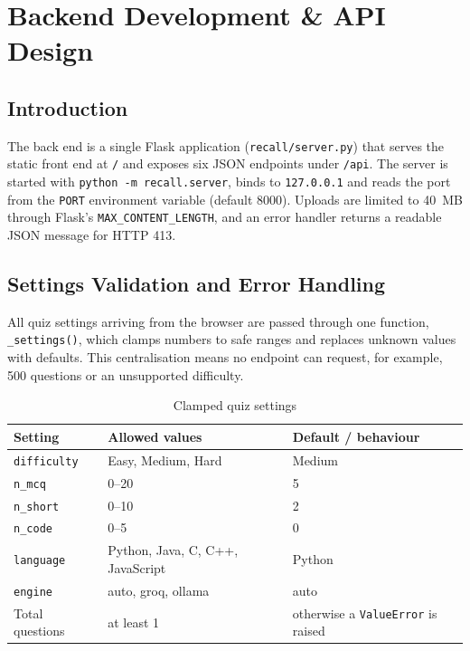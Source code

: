 \chapter{Backend Development \& API Design}

\section{Introduction}
The back end is a single Flask application (\texttt{recall/server.py}) that serves the static front end at \texttt{/} and exposes six JSON endpoints under \texttt{/api}. The server is started with \texttt{python -m recall.server}, binds to \texttt{127.0.0.1} and reads the port from the \texttt{PORT} environment variable (default 8000). Uploads are limited to 40~MB through Flask's \texttt{MAX\_CONTENT\_LENGTH}, and an error handler returns a readable JSON message for HTTP 413.

\section{Settings Validation and Error Handling}
All quiz settings arriving from the browser are passed through one function, \texttt{\_settings()}, which clamps numbers to safe ranges and replaces unknown values with defaults. This centralisation means no endpoint can request, for example, 500 questions or an unsupported difficulty.

\begin{table}[H]
\centering
\begin{tabularx}{\textwidth}{@{} p{3cm} p{3.6cm} X @{}}
\toprule
\textbf{Setting} & \textbf{Allowed values} & \textbf{Default / behaviour} \\
\midrule
\texttt{difficulty} & Easy, Medium, Hard & Medium \\
\texttt{n\_mcq} & 0--20 & 5 \\
\texttt{n\_short} & 0--10 & 2 \\
\texttt{n\_code} & 0--5 & 0 \\
\texttt{language} & Python, Java, C, C++, JavaScript & Python \\
\texttt{engine} & auto, groq, ollama & auto \\
Total questions & at least 1 & otherwise a \texttt{ValueError} is raised \\
\bottomrule
\end{tabularx}
\caption{Clamped quiz settings}
\label{tab:settings}
\end{table}

